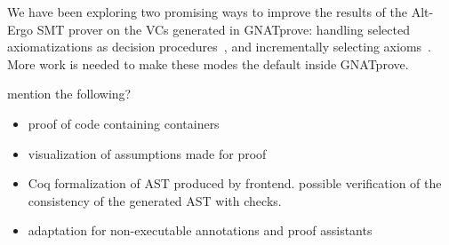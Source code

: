 \documentclass[sttt,draft]{svjour}
\newcommand{\gnatprove}{GNATprove\xspace}
\begin{document}
We have been exploring two promising ways to improve the results of the
Alt-Ergo SMT prover on the VCs generated in \gnatprove: handling selected
axiomatizations as decision procedures~\cite{dross:2012:smt}, and incrementally
selecting axioms~\cite{cgs09:ipo,kuhlwein:2012:ijcar}. More work is needed to
make these modes the default inside \gnatprove.

mention the following?

\begin{itemize}
\item proof of code containing containers
\item visualization of assumptions made for proof
\item Coq formalization of AST produced by frontend. possible verification of
  the consistency of the generated AST with checks.
\item adaptation for non-executable annotations and proof assistants
\end{itemize}

%


\end{document}
